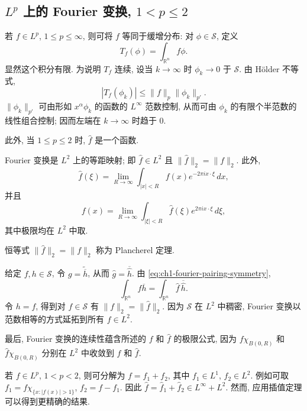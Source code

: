 \subsection{$L^p$ 上的 Fourier 变换, $1<p\le2$}
\label{sec:ch1-fourier-transform-lp}

若 $f\in L^p$, $1\le p\le\infty$, 则可将 $f$ 等同于缓增分布: 对 $\phi\in\mathcal S$, 定义
\[
 T_f(\phi)=\int_{\mathbb R^n}f\phi.
\]
显然这个积分有限. 为说明 $T_f$ 连续, 设当 $k\to\infty$ 时 $\phi_k\to0$ 于 $\mathcal S$. 由 Hölder 不等式,
\[
 |T_f(\phi_k)|\le\|f\|_p\|\phi_k\|_{p'}.
\]
$\|\phi_k\|_{p'}$ 可由形如 $x^\alpha\phi_k$ 的函数的 $L^\infty$ 范数控制, 从而可由 $\phi_k$ 的有限个半范数的线性组合控制; 因而左端在 $k\to\infty$ 时趋于 $0$.

此外, 当 $1\le p\le2$ 时, $\widehat f$ 是一个函数.

\begin{Theorem}
\label{thm:ch1-plancherel}
Fourier 变换是 $L^2$ 上的等距映射; 即 $\widehat f\in L^2$ 且 $\|\widehat f\|_2=\|f\|_2$. 此外,
\[
 \widehat f(\xi)=\lim_{R\to\infty}\int_{|x|<R}f(x)e^{-2\pi ix\cdot\xi}\,dx,
\]
并且
\[
 f(x)=\lim_{R\to\infty}\int_{|\xi|<R}\widehat f(\xi)e^{2\pi ix\cdot\xi}\,d\xi,
\]
其中极限均在 $L^2$ 中取.
\end{Theorem}

恒等式 $\|\widehat f\|_2=\|f\|_2$ 称为 Plancherel 定理.

\hypertarget{chapter-01-page-028}{}
\begin{Proof}
给定 $f,h\in\mathcal S$, 令 $g=\widetilde{\overline h}$, 从而 $\widehat g=\overline{\widehat h}$. 由 \eqref{eq:ch1-fourier-pairing-symmetry},
\begin{equation}
\label{eq:ch1-plancherel-pairing}
 \int_{\mathbb R^n}f\overline h=\int_{\mathbb R^n}\widehat f\,\overline{\widehat h}.
\end{equation}
令 $h=f$, 得到对 $f\in\mathcal S$ 有 $\|f\|_2=\|\widehat f\|_2$. 因为 $\mathcal S$ 在 $L^2$ 中稠密, Fourier 变换以范数相等的方式延拓到所有 $f\in L^2$.

最后, Fourier 变换的连续性蕴含所述的 $f$ 和 $\widehat f$ 的极限公式, 因为 $f\chi_{B(0,R)}$ 和 $\widehat f\chi_{B(0,R)}$ 分别在 $L^2$ 中收敛到 $f$ 和 $\widehat f$.
\end{Proof}

若 $f\in L^p$, $1<p<2$, 则可分解为 $f=f_1+f_2$, 其中 $f_1\in L^1$, $f_2\in L^2$. 例如可取 $f_1=f\chi_{\{x:|f(x)|>1\}}$, $f_2=f-f_1$. 因此 $\widehat f=\widehat f_1+\widehat f_2\in L^\infty+L^2$. 然而, 应用插值定理可以得到更精确的结果.

